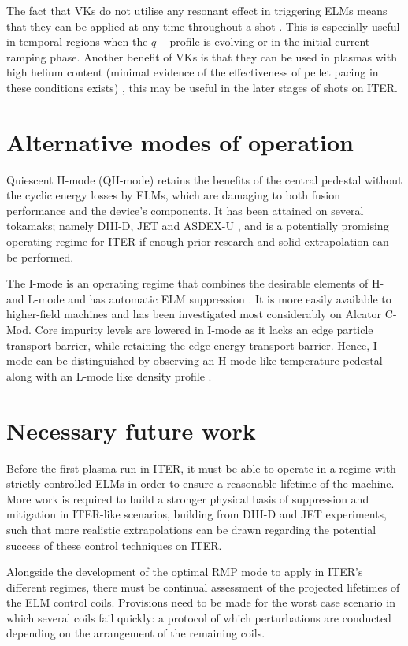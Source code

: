\documentclass[11pt, twocolumn]{article}  %
\newcommand{\citep}[1]{\cite{#1}}
\begin{document}
The fact that VKs do not utilise any resonant effect in triggering ELMs means that they can be applied at any time throughout a shot \cite{Chapman2016}. This is especially useful in temporal regions when the $q-$profile is evolving or in the initial current ramping phase. Another benefit of VKs is that they can be used in plasmas with high helium content (minimal evidence of the effectiveness of pellet pacing in these conditions exists) \citep{Chapman2016}, this may be useful in the later stages of shots on ITER. 

\section{Alternative modes of operation}\label{sec:altmodes}
Quiescent H-mode (QH-mode) retains the benefits of the central pedestal without the cyclic energy losses by ELMs, which are damaging to both fusion performance and the device's components. It has been attained on several tokamaks; namely DIII-D, JET and ASDEX-U \cite{Burrell2002, Suttrop2005}, and is a potentially promising operating regime for ITER if enough prior research and solid extrapolation can be performed.

The I-mode is an operating regime that combines the desirable elements of H- and L-mode \cite{Whyte2010} and has automatic ELM suppression \cite{Marmar2015}. It is more easily available to higher-field machines and has been investigated most considerably on Alcator C-Mod. Core impurity levels are lowered in I-mode as it lacks an edge particle transport barrier, while retaining the edge energy transport barrier. Hence, I-mode can be distinguished by observing an H-mode like temperature pedestal along with an L-mode like density profile \cite{Whyte2010}.

\section{Necessary future work}\label{sec:Future}
Before the first plasma run in ITER, it must be able to operate in a regime with strictly controlled ELMs in order to ensure a reasonable lifetime of the machine. More work is required to build a stronger physical basis of suppression and mitigation in ITER-like scenarios, building from DIII-D \cite{Evans2008,Lanctot2013} and JET \cite{Liang2013} experiments, such that more realistic extrapolations can be drawn regarding the potential success of these control techniques on ITER.

Alongside the development of the optimal RMP mode to apply in ITER's different regimes, there must be continual assessment of the projected lifetimes of the ELM control coils. Provisions need to be made for the worst case scenario in which several coils fail quickly: a protocol of which perturbations are conducted depending on the arrangement of the remaining coils. 
\end{document}
